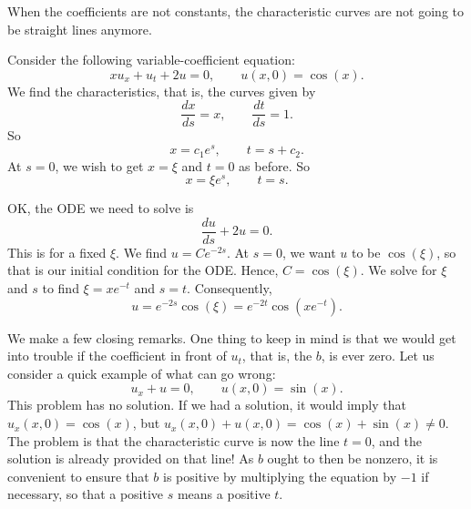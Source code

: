When the coefficients are not constants, the characteristic curves
are not going to be straight lines anymore.

\begin{example}
Consider the following variable-coefficient equation:
\begin{equation*}
x u_x + u_t + 2 u = 0, \qquad u(x,0) = \cos(x) . %
\end{equation*}
We find the characteristics, that is, the curves given by
\begin{equation*}
\frac{dx}{ds} = x, \qquad \frac{dt}{ds} = 1 .
\end{equation*}
So
\begin{equation*}
x = c_1 e^{s} , \qquad t = s+ c_2 .
\end{equation*}
At $s=0$, we wish to get $x=\xi$ and $t=0$ as before.  So
\begin{equation*}
x = \xi e^s, \qquad t = s .
\end{equation*}

OK\@, the ODE we need to solve is
\begin{equation*}
\frac{du}{ds} + 2 u = 0 .
\end{equation*}
This is for a fixed $\xi$.  We find $u = C e^{-2s}$.
At $s=0$, we want $u$ to be
$\cos(\xi)$, so that is our initial condition for the ODE\@.
Hence, $C = \cos(\xi)$.
We solve for $\xi$ and $s$ to find
$\xi = xe^{-t}$ and $s=t$.
Consequently,
\begin{equation*}
u = e^{-2s} \cos(\xi)= e^{-2t} \cos(xe^{-t}) .
\end{equation*}
\end{example}


We make a few closing remarks.
One thing to keep in mind is that we would get into trouble if the
coefficient in front of $u_t$, that is, the $b$, is ever zero.
Let us consider a quick example of what can go wrong:
\begin{equation*}
u_x + u = 0, \qquad u(x,0) = \sin(x).
\end{equation*}
This problem has no solution.  If we had a solution, it
would imply that $u_x(x,0) = \cos(x)$,
but $u_x(x,0) + u(x,0) = \cos(x) + \sin(x) \neq 0$.
The problem is that the characteristic curve is now the line $t=0$,
and the solution is already provided on that line!
As $b$ ought to then be nonzero,
it is convenient to ensure that $b$ is positive by multiplying
the equation by $-1$
if necessary, so that a positive $s$ means a positive $t$.

